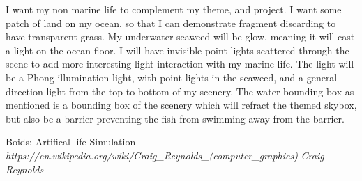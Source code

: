 \documentclass[a4paper, 10pt]{article}
\begin{document}
I want my non marine life to complement my theme, and project. I want some patch of land on my ocean, so that I can demonstrate fragment discarding to have transparent grass. My underwater seaweed
will be glow, meaning it will cast a light on the ocean floor. I will have invisible point lights scattered through the scene to add more interesting light interaction with my marine life. 
The light will be a Phong illumination light, with point lights in the seaweed, and a general direction light from the top to bottom of my scenery. The water bounding box as mentioned is a bounding box
of the scenery which will refract the themed skybox, but also be a barrier preventing the fish from swimming away from the barrier.

\begin{thebibliography}{9}
Boids: Artifical life Simulation
\textit{https://en.wikipedia.org/wiki/Craig\_Reynolds\_(computer\_graphics)}
\textit{Craig Reynolds}
\end{thebibliography}
\end{document}
